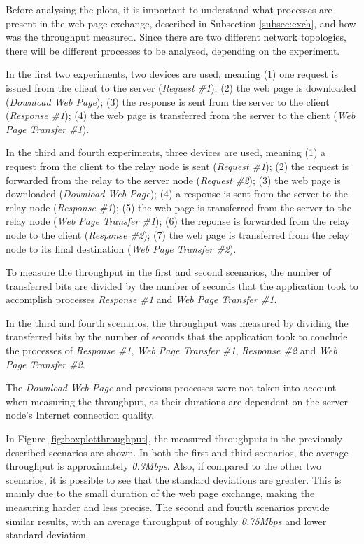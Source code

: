 Before analysing the plots, it is important to understand what processes are present in the web page exchange, described in Subsection \ref{subsec:exch}, and how was the throughput measured. Since there are two different network topologies, there will be different processes to be analysed, depending on the experiment.

In the first two experiments, two devices are used, meaning (1) one request is issued from the client to the server (\textit{Request \#1}); (2) the web page is downloaded (\textit{Download Web Page}); (3) the response is sent from the server to the client (\textit{Response \#1}); (4) the web page is transferred from the server to the client (\textit{Web Page Transfer \#1}).

In the third and fourth experiments, three devices are used, meaning (1) a request from the client to the relay node is sent (\textit{Request \#1}); (2) the request is forwarded from the relay to the server node (\textit{Request \#2}); (3) the web page is downloaded (\textit{Download Web Page}); (4) a response is sent from the server to the relay node (\textit{Response \#1}); (5) the web page is transferred from the server to the relay node (\textit{Web Page Transfer \#1}); (6) the reponse is forwarded from the relay node to the client (\textit{Response \#2}); (7) the web page is transferred from the relay node to its final destination (\textit{Web Page Transfer \#2}).

To measure the throughput in the first and second scenarios, the number of transferred bits are divided by the number of seconds that the application took to accomplish processes \textit{Response \#1} and \textit{Web Page Transfer \#1}.

In the third and fourth scenarios, the throughput was measured by dividing the transferred bits by the number of seconds that the application took to conclude the processes of \textit{Response \#1}, \textit{Web Page Transfer \#1}, \textit{Response \#2} and \textit{Web Page Transfer \#2}.

The \textit{Download Web Page} and previous processes were not taken into account when measuring the throughput, as their durations are dependent on the server node's Internet connection quality.

In Figure \ref{fig:boxplotthroughput}, the measured throughputs in the previously described scenarios are shown. In both the first and third scenarios, the average throughput is approximately \textit{0.3Mbps}. Also, if compared to the other two scenarios, it is possible to see that the standard deviations are greater. This is mainly due to the small duration of the web page exchange, making the measuring harder and less precise. The second and fourth scenarios provide similar results, with an average throughput of roughly \textit{0.75Mbps} and lower standard deviation.

